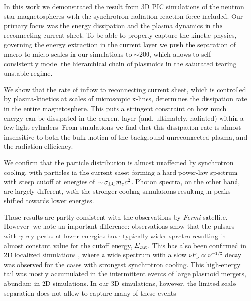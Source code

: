 In this work we demonstrated the result from 3D PIC simulations of the neutron star magnetospheres with the synchrotron radiation reaction force included. Our primary focus was the energy dissipation and the plasma dynamics in the reconnecting current sheet. To be able to properly capture the kinetic physics, governing the energy extraction in the current layer we push the separation of macro-to-micro scales in our simulations to $\sim 200$, which allows to self-consistently model the hierarchical chain of plasmoids in the saturated tearing unstable regime. 

We show that the rate of inflow to reconnecting current sheet, which is controlled by plasma-kinetics at scales of microscopic x-lines, determines the dissipation rate in the entire magnetosphere. This puts a stringent constraint on how much energy can be dissipated in the current layer (and, ultimately, radiated) within a few light cylinders. From simulations we find that this dissipation rate is almost insensitive to both the bulk motion of the background unreconnected plasma, and the radiation efficiency.

We confirm that the particle distribution is almost unaffected by synchrotron cooling, with particles in the current sheet forming a hard power-law spectrum with steep cutoff at energies of $\sim \sigma_{\rm LC}m_e c^2$. Photon spectra, on the other hand, are largely different, with the stronger cooling simulations resulting in peaks shifted towards lower energies. 

These results are partly consistent with the observations by \emph{Fermi} satellite. However, we note an important difference: observations show that the pulsars with $\gamma$-ray peaks at lower energies have typically wider spectra resulting in almost constant value for the cutoff energy, $E_{\rm cut}$. This has also been confirmed in 2D localized simulations \citep{2019ApJ...877...53H}, where a wide spectrum with a slow $\nu F_\nu\propto \nu^{-1/2}$ decay was observed for the cases with strongest synchrotron cooling. This high-energy tail was mostly accumulated in the intermittent events of large plasmoid mergers, abundant in 2D simulations. In our 3D simulations, however, the limited scale separation does not allow to capture many of these events.